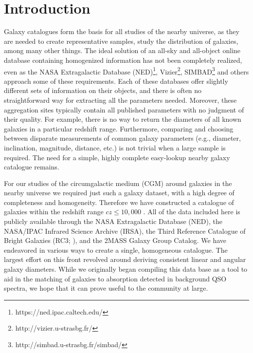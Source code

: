 \cleardoublepage



\section{Introduction}

Galaxy catalogues form the basis for all studies of the nearby universe, as they are needed to create representative samples, study the distribution of galaxies, among many other things. The ideal solution of an all-sky and all-object online database containing homogenized information has not been completely realized, even as the NASA Extragalactic Database (NED)\footnote{https://ned.ipac.caltech.edu/}, Vizier\footnote{http://vizier.u-strasbg.fr/}, SIMBAD\footnote{http://simbad.u-strasbg.fr/simbad/} and others approach some of these requirements. Each of these databases offer slightly different sets of information on their objects, and there is often no straightforward way for extracting all the parameters needed. Moreover, these aggregation sites typically contain all published parameters with no judgment of their quality. For example, there is no way to return the diameters of all known galaxies in a particular redshift range. Furthermore, comparing and choosing between disparate measurements of common galaxy parameters (e.g., diameter, inclination, magnitude, distance, etc.) is not trivial when a large sample is required. The need for a simple, highly complete easy-lookup nearby galaxy catalogue remains.

For our studies of the circumgalactic medium (CGM) around galaxies in the nearby universe we required just such a galaxy dataset, with a high degree of completeness and homogeneity. Therefore we have constructed a catalogue of galaxies within the redshift range $cz \leq 10,000$ \kms. All of the data included here is publicly available through the NASA Extragalactic Database (NED), the NASA/IPAC Infrared Science Archive (IRSA), the Third Reference Catalogue of Bright Galaxies (RC3; \citealt{RC3}), and the \cite{tully2015} 2MASS Galaxy Group Catalog. We have endeavored in various ways to create a single, homogeneous catalogue. The largest effort on this front revolved around deriving consistent linear and angular galaxy diameters. While we originally began compiling this data base as a tool to aid in the matching of galaxies to absorption detected in background QSO spectra,  we hope that it can prove useful to the community at large. 

